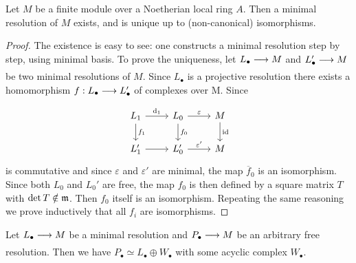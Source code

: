 \documentclass[../main]{subfiles}
\begin{document}
\begin{lemma}\label{lem:18.08} Let $M$ be a finite module over a Noetherian local ring $A$. Then a minimal resolution of $M$ exists, and is unique up to (non-canonical) isomorphisms.
\end{lemma}
\begin{proof}
The existence is easy to see: one constructs a minimal resolution step by step, using minimal basis. To prove the uniqueness, let $L_\bullet \varrightarrow{} M$ and $L'_\bullet \varrightarrow{} M$ be two minimal resolutions of $M$. Since $L_\bullet$ is a projective resolution there exists a homomorphism $f : L_\bullet\varrightarrow{} L'_\bullet$ of complexes over M. Since
\[\begin{tikzcd}
L_1\arrow[d,"f_1"] \arrow[r,"\dd_1"] &L_0 \arrow[d,"f_0"]\arrow[r,"\varepsilon"] &M\arrow[d,"\id"]\\ L_1' \arrow[r]& L_0' \arrow[r,"\varepsilon'"] &M
\end{tikzcd}\]
is commutative and since $\varepsilon$ and $\varepsilon'$ are minimal, the map $\overline{f}_{0}$ is an isomorphism. Since both $L_{0}$ and $L_{0}'$ are free, the map $f_{0}$ is then defined by a square matrix $T$ with $\det T \notin \mathfrak{m}$. Then $f_{0}$ itself is an isomorphism. Repeating the same reasoning we prove inductively that all $f_{i}$ are isomorphisms.
\end{proof}

\begin{exercise} Let $L_\bullet \varrightarrow{} M$ be a minimal resolution and $P_\bullet\varrightarrow{} M$ be an arbitrary free resolution. Then we have $P_\bullet \simeq L_\bullet \oplus W_\bullet$ with some acyclic complex $W_\bullet$.
\end{exercise}
\end{document}
